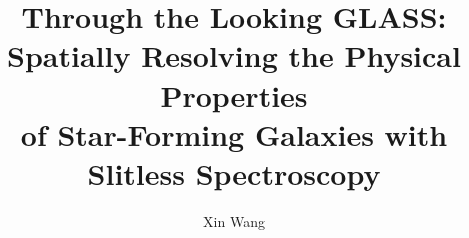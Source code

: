 \documentclass[PhD]{uclathes}
\title          {Through the Looking GLASS: \\
                Spatially Resolving the Physical Properties \\
                of Star-Forming Galaxies with Slitless Spectroscopy}
\author         {Xin Wang}
\begin{document}
\makeintropages

%

\appendix

%
%



\end{document}
